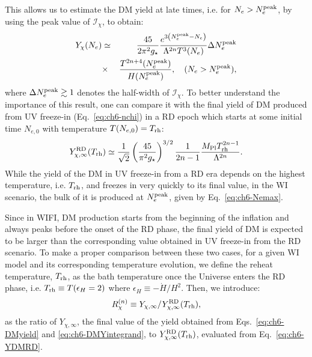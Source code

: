 This allows us to estimate the DM yield at late times, i.e. for $N_e> N_e^{\rm{peak}}$, by using the peak value of $\mathcal{I}_\chi$, to obtain:
\begin{eqnarray}
   \nonumber Y_\chi(N_e)&\simeq&\frac{45}{2\pi^2g_{\star}}\frac{e^{3\left(N_{e}^{\rm peak}-N_e\right)}}{\Lambda^{2n}T^3(N_e)}\Delta N_{e}^{\rm peak} \\
   &\times& \frac{T^{2n+4}(N_e^{\rm peak})}{ H(N_e^{\rm peak})}, \quad (N_e> N_e^{\rm{peak}}),
   \label{eq:ch6-estY}
\end{eqnarray}
where $\Delta N_e^{\rm{peak}}\gtrsim 1$ denotes the
half-width of $\mathcal{I}_\chi$.
To better understand the importance of this result, one can compare it with the final yield of DM produced from UV freeze-in (Eq.~\eqref{eq:ch6-nchi}) in a RD epoch which starts at some initial time $N_{e, 0}$ with temperature $T(N_{e, 0})=T_{\rm rh}$:
\begin{equation}
Y^{\rm{RD}}_{\chi,\infty}(T_{\rm rh})\simeq \frac{1}{\sqrt{2}}\left(\frac{45}{\pi^2 g_\star}\right)^{3/2}\frac{1}{2n-1}\frac{M_{\rm{Pl}}T_{\rm{rh}}^{2n-1}}{\Lambda^{2n}}.
    \label{eq:ch6-YDMRD}
\end{equation}
While the yield of the DM in UV freeze-in from a RD era depends on the highest temperature, i.e. $T_{\rm{rh}}$, and freezes in very quickly to its final value, in the WI scenario, the bulk of it is produced at $N_e^{\rm peak}$, given by Eq.~\eqref{eq:ch6-Nemax}.

Since in WIFI, DM production starts from the beginning of the inflation and always peaks before the onset of the RD phase, the final yield of DM is expected to be larger than the corresponding value obtained in UV freeze-in from the RD scenario.
To make a proper comparison between these two cases, for a given WI model and its corresponding temperature evolution, we define the reheat temperature, $T_{\rm rh}$, as the bath temperature once the Universe enters the RD phase, i.e. $T_{\rm{rh}}\equiv T(\epsilon_H=2)$ where $\epsilon_H\equiv-\Dot{H}/H^2$. Then, we introduce:
\begin{equation}
    R^{(n)}_{\chi}\equiv Y_{\chi,\infty}/Y^{\rm{RD}}_{\chi,\infty}(T_{\rm{rh}}),\label{eq:ch6-enhancement_ratio}
\end{equation}
as the ratio of $Y_{\chi,\infty}$, the final value of the yield obtained from Eqs.~\eqref{eq:ch6-DMyield} and \eqref{eq:ch6-DMYintegrand}, to $Y_{\chi,\infty}^{\rm{RD}}(T_{\rm{rh}})$, evaluated from Eq.~\eqref{eq:ch6-YDMRD}.

